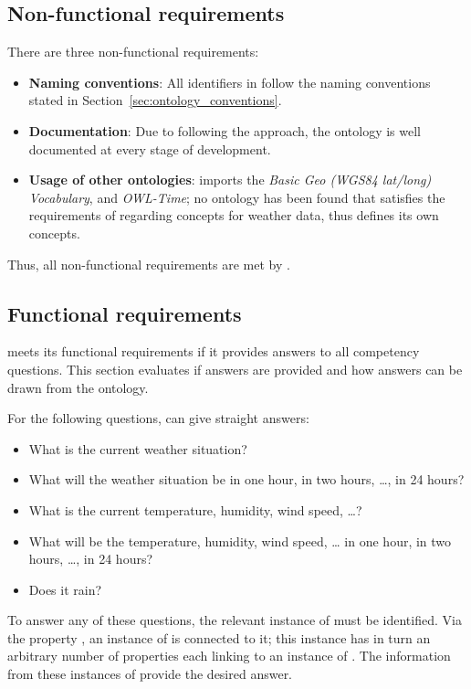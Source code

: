 \subsection{Non-functional requirements}
\label{sec:evaluation_non_functional}

There are three non-functional requirements:

\begin{itemize}
  \item \textbf{Naming conventions}: All identifiers in \smarthomeweather follow the naming conventions stated in Section~\ref{sec:ontology_conventions}.
  \item \textbf{Documentation}: Due to following the \methontology approach, the ontology is well documented at every stage of development.
  \item \textbf{Usage of other ontologies}: \smarthomeweather imports the \emph{Basic Geo (WGS84 lat/long) Vocabulary}, \muo and \emph{OWL-Time}; no ontology has been found that satisfies the requirements of \smarthomeweather regarding concepts for weather data, thus \smarthomeweather defines its own concepts.
\end{itemize}

Thus, all non-functional requirements are met by \smarthomeweather.

\subsection{Functional requirements}
\label{sec:evaluation_functional}

\smarthomeweather meets its functional requirements if it provides answers to all competency questions. This section evaluates if answers are provided and how answers can be drawn from the ontology.

For the following questions, \smarthomeweather can give straight answers:
\begin{itemize}
  \item What is the current weather situation?
  \item What will the weather situation be in one hour, in two hours, …, in 24 hours?
  \item What is the current temperature, humidity, wind speed, …?
  \item What will be the temperature, humidity, wind speed, … in one hour, in two hours, …, in 24 hours?
  \item Does it rain?
\end{itemize}
To answer any of these questions, the relevant instance of  must be identified. Via the property , an instance of  is connected to it; this instance has in turn an arbitrary number of  properties each linking to an instance of . The information from these instances of  provide the desired answer.

